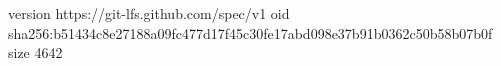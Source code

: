 version https://git-lfs.github.com/spec/v1
oid sha256:b51434c8e27188a09fc477d17f45c30fe17abd098e37b91b0362c50b58b07b0f
size 4642
